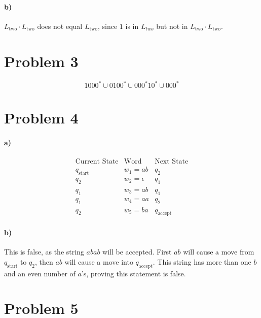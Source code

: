 \documentclass[12pt]{article}
\begin{document}
\paragraph{b)}

\(L_\text{two}\cdot L_\text{two}\) does not equal \(L_\text{two}\), since \(1\) is in \(L_{two}\) but not in \(L_\text{two}\cdot L_\text{two}\).

\section*{Problem 3}

\[1000^* \cup 0100^* \cup 000^*10^* \cup 000^*\]

\section*{Problem 4}

\paragraph{a)}

\[
        \begin{array}{c|c|c}
                \text{Current State} & \text{Word} & \text{Next State}\\
                \hline
                q_\text{start} & w_1 = ab & q_2\\
                q_2 & w_2 = \epsilon & q_1\\
                q_1 & w_3 = ab & q_1\\
                q_1 & w_4 = aa & q_2\\
                q_2 & w_5 = ba & q_\text{accept}
        \end{array}
\]

\paragraph{b)}

This is false, as the string \(abab\) will be accepted. First \(ab\) will cause a move from \(q_\text{start}\) to \(q_2\), then \(ab\) will cause
a move into \(q_\text{accept}\). This string has more than one \(b\) and an even number of \(a\)'s, proving this statement is false.

\section*{Problem 5}
\end{document}
